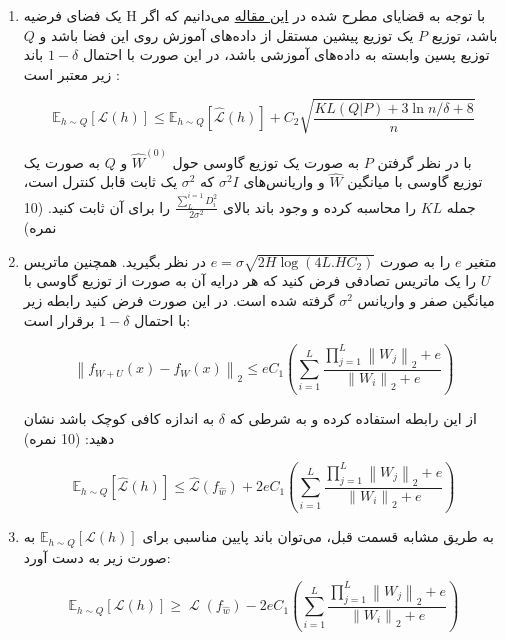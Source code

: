 \documentclass{article}
\DeclareMathOperator{\Loss}{\mathcal{L}}
\begin{document}
\begin{enumerate}
\item
با توجه به قضایای مطرح شده در 
\href{https://citeseerx.ist.psu.edu/viewdoc/download?doi=10.1.1.46.6957&rep=rep1&type=pdf}{این مقاله}
می‌دانیم که اگر
$\mathrm{H}$
یک فضای فرضیه باشد، توزیع 
$P$
یک توزیع پیشین مستقل از داده‌های آموزش روی این فضا باشد و 
$Q$
توزیع پسین وابسته به داده‌های آموزشی باشد، در این صورت با احتمال 
$1-\delta$
باند زیر معتبر است
:

\begin{equation} \label{eq:mc}
    \mathbb{E}_{h\sim Q}[\mathcal{L}(h)] \leq
    \mathbb{E}_{h\sim Q}[\hat{\mathcal{L}}(h)] + C_2 \sqrt{
    \frac{KL(Q|P) + 3 \ln {n/\delta} + 8}{n}
    }
\end{equation}

با در نظر گرفتن 
$P$
به صورت یک توزیع گاوسی حول
$\hat{W}^{(0)}$
و
$Q$
به صورت یک توزیع گاوسی 
با میانگین 
$\hat{W}$
و واریانس‌های 
$\sigma^2 I$
که 
$\sigma^2$
یک ثابت قابل کنترل است، 
جمله 
$KL$
را محاسبه کرده و وجود باند بالای
$\frac{\sum_{L}^{i=1}D_i^2}{2\sigma^2}$
را برای آن ثابت کنید.
(10 نمره)
\item
متغیر
$e$
را به صورت 
$e = \sigma \sqrt{2H \log (4L.HC_2)}$
در نظر بگیرید.
همچنین ماتریس
$U$
را یک ماتریس تصادفی فرض کنید که هر درایه آن به صورت
از توزیع گاوسی با میانگین صفر و واریانس 
$\sigma^2$
گرفته شده است.
در این صورت فرض کنید رابطه زیر با احتمال 
$1-\delta$
برقرار است:

\begin{equation}\label{eq:1delta}
    \left\lVert f_{W+U}(x) - f_W(x) \right\rVert_2 \leq  e C_1 
    (\sum_{i=1}^L
    \frac
    {\prod_{j=1}^{L}\left\lVert W_j \right\rVert_2+e}
    {\left\lVert W_i \right\rVert_2+e}
    )
\end{equation}

از این رابطه استفاده کرده و به شرطی که 
$\delta$
به اندازه کافی کوچک باشد نشان دهید:
(10 نمره)

\begin{equation}\label{eq:ub}
    \mathbb{E}_{h\sim Q}[\hat{\mathcal{L}}(h)] \leq \hat{\mathcal{L}}(f_{\hat{w}}) + 
    2e C_1 (\sum_{i=1}^L
    \frac
    {\prod_{j=1}^{L}\left\lVert W_j \right\rVert_2+e}
    {\left\lVert W_i \right\rVert_2+e}
    )
\end{equation}

\item
به طریق مشابه قسمت قبل، می‌توان باند پایین مناسبی برای
$\mathbb{E}_{h\sim Q}[\mathcal{L}(h)]$
به صورت زیر به دست آورد:

\begin{equation}\label{eq:lb}
    \mathbb{E}_{h\sim Q}[\mathcal{L}(h)] \geq \Loss (f_{\hat{w}}) -
    2e C_1 (\sum_{i=1}^L
    \frac
    {\prod_{j=1}^{L}\left\lVert W_j \right\rVert_2+e}
    {\left\lVert W_i \right\rVert_2+e}
    )
\end{equation}


\end{enumerate}
\end{document}
